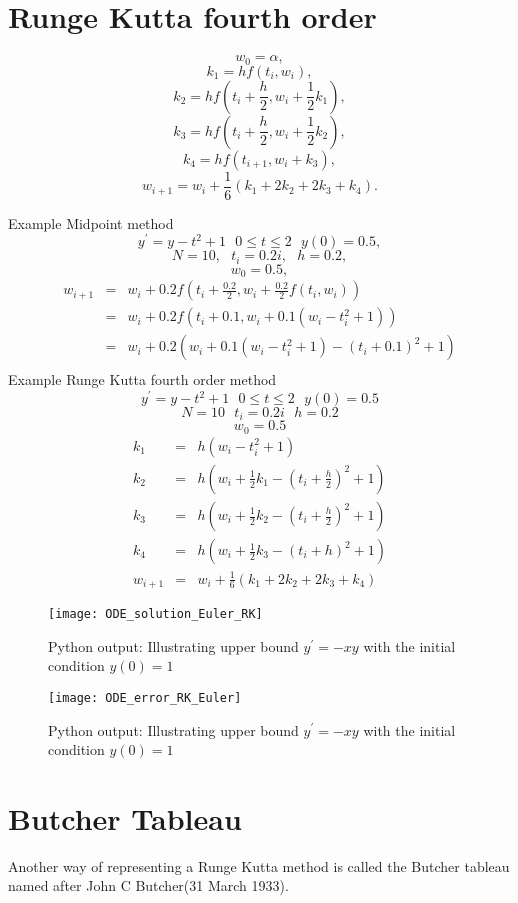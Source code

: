 \section{Runge Kutta fourth order}
\[w_0 = \alpha, \]
\[k_1 = hf(t_i,w_i), \]
\[k_2 = hf(t_i+\frac{h}{2},w_i+\frac{1}{2}k_1), \]
\[k_3 = hf(t_i+\frac{h}{2},w_i+\frac{1}{2}k_2), \]
\[k_4 = hf(t_{i+1},w_i+k_3), \]
\[w_{i+1}=w_{i}+\frac{1}{6}(k_1+2k_2+2k_3+k_4). \]
\begin{example}
Example Midpoint method
\[y^{'}=y-t^2+1 \ \ \ 0 \leq t \leq 2 \ \ \ y(0)=0.5, \]
\[N=10, \ \ \ t_i=0.2i, \ \ \ h=0.2, \]
\[w_0=0.5, \]
\begin{eqnarray*}
w_{i+1} &=& w_{i} + 0.2f(t_i+\frac{0.2}{2},w_i+\frac{0.2}{2}f(t_i,w_i))\\
 &=& w_{i} + 0.2f(t_i+0.1,w_i+0.1(w_i-t^2_i+1))\\
 &=& w_{i} + 0.2(w_i+0.1(w_i-t^2_i+1)-(t_i+0.1)^2+1)\\
\end{eqnarray*}
Example Runge Kutta fourth order method
\[y^{'}=y-t^2+1 \ \ \ 0 \leq t \leq 2 \ \ \ y(0)=0.5 \]
\[N=10 \ \ \ t_i=0.2i \ \ \ h=0.2 \]
\[w_0=0.5 \]
\begin{eqnarray*}
k_1&=&h(w_i-t_i^2+1)\\
k_2&=&h(w_i+\frac{1}{2}k_1-(t_i+\frac{h}{2})^2+1)\\
k_3&=&h(w_i+\frac{1}{2}k_2-(t_i+\frac{h}{2})^2+1)\\
k_4&=&h(w_i+\frac{1}{2}k_3-(t_i+h)^2+1)\\
w_{i+1} &=& w_{i} + \frac{1}{6}(k_1+2k_2+2k_3+k_4)
\end{eqnarray*}
\begin{figure}[H]
\centering
\texttt{[image: ODE\_solution\_Euler\_RK]}
\caption{Python output: Illustrating upper bound $y^{'}=-xy$ with the initial condition $y(0)=1$ }
\label{RK vs Euler Figure}
\end{figure}
\begin{figure}[H]
\centering
\texttt{[image: ODE\_error\_RK\_Euler]}
\caption{Python output: Illustrating upper bound $y^{'}=-xy$ with the initial condition $y(0)=1$ }
\label{Modified Euler Figure}
\end{figure}
\end{example}
\section{Butcher Tableau}

Another way of representing a Runge Kutta method is called the Butcher tableau named after John C Butcher(31 March 1933).

